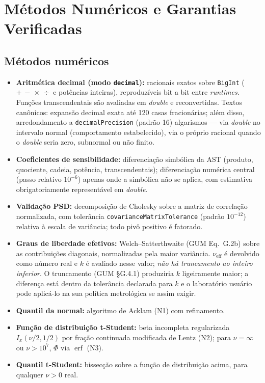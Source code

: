 \documentclass[11pt,a4paper]{article}
\begin{document}
\section{Métodos Numéricos e Garantias Verificadas}
\label{sec:metodos}

\subsection{Métodos numéricos}

\begin{itemize}
  \item \textbf{Aritmética decimal (modo \texttt{decimal}):} racionais exatos sobre \texttt{BigInt} (\(+\,-\,\times\,\div\) e potências inteiras), reproduzíveis bit a bit entre \emph{runtimes}. Funções transcendentais são avaliadas em \emph{double} e reconvertidas. Textos canônicos: expansão decimal exata até 120 casas fracionárias; além disso, arredondamento a \texttt{decimalPrecision} (padrão 16) algarismos --- via \emph{double} no intervalo normal (comportamento estabelecido), via o próprio racional quando o \emph{double} seria zero, subnormal ou não finito.
  \item \textbf{Coeficientes de sensibilidade:} diferenciação simbólica da AST (produto, quociente, cadeia, potência, transcendentais); diferenciação numérica central (passo relativo \(10^{-6}\)) apenas onde a simbólica não se aplica, com estimativa obrigatoriamente representável em \emph{double}.
  \item \textbf{Validação PSD:} decomposição de Cholesky sobre a matriz de correlação normalizada, com tolerância \texttt{covarianceMatrixTolerance} (padrão \(10^{-12}\)) relativa à escala de variância; todo pivô positivo é fatorado.
  \item \textbf{Graus de liberdade efetivos:} Welch--Satterthwaite (GUM Eq.~G.2b) sobre as contribuições diagonais, normalizadas pela maior variância. \(\nu_{\text{eff}}\) é devolvido como número real e \(k\) é avaliado nesse valor; \emph{não há truncamento ao inteiro inferior}. O truncamento (GUM §G.4.1) produziria \(k\) ligeiramente maior; a diferença está dentro da tolerância declarada para \(k\) e o laboratório usuário pode aplicá-lo na sua política metrológica se assim exigir.
  \item \textbf{Quantil da normal:} algoritmo de Acklam (N1) com refinamento.
  \item \textbf{Função de distribuição t-Student:} beta incompleta regularizada \(I_x(\nu/2, 1/2)\) por fração continuada modificada de Lentz (N2); para \(\nu = \infty\) ou \(\nu > 10^{7}\), \(\Phi\) via \(\operatorname{erf}\) (N3).
  \item \textbf{Quantil t-Student:} bissecção sobre a função de distribuição acima, para qualquer \(\nu > 0\) real.
\end{itemize}
\end{document}
